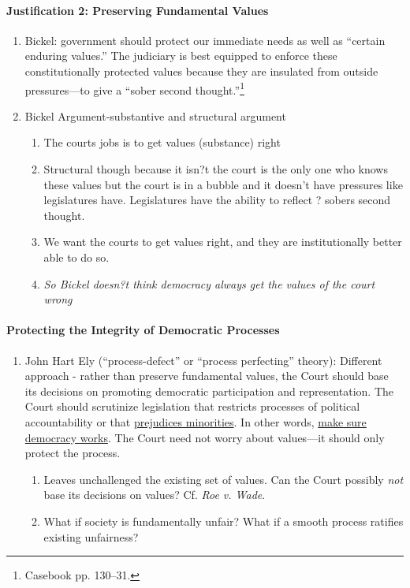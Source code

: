 \begin{enumerate}
\paragraph{Justification 2: Preserving Fundamental Values}

\begin{enumerate}
    \item Bickel: government should protect our immediate needs as well as 
    ``certain enduring values.'' The judiciary is best equipped to enforce 
    these constitutionally protected values because they are insulated from 
    outside pressures---to give a ``sober second thought.''\footnote{Casebook 
    pp. 130--31.}
  \item Bickel Argument-substantive and structural argument
  \begin{enumerate}
  \item The courts jobs is to get values (substance) right
\item Structural though because it isn?t the court is the only one who knows these values but the court is in a bubble and it doesn't have pressures like legislatures have. Legislatures have the ability to reflect ? sobers second thought. 
\item We want the courts to get values right, and they are institutionally better able to do so. 
\item \emph{So Bickel doesn?t think democracy always get the values of the court wrong}
\end{enumerate}
\end{enumerate}
\paragraph{Protecting the Integrity of Democratic Processes}

\begin{enumerate}
    \item John Hart Ely (``process-defect'' or ``process perfecting'' theory): 
    Different approach - rather than preserve fundamental values, the Court should base its 
    decisions on promoting democratic participation and representation. The 
    Court should scrutinize legislation that restricts processes of political 
    accountability or that \underline{prejudices minorities}. In other words, \underline{make sure 
    democracy works}. The Court need not worry about values---it should only 
    protect the process.
    \begin{enumerate}
        \item Leaves unchallenged the existing set of values. Can the Court 
        possibly \emph{not} base its decisions on values? Cf. \emph{Roe v. 
        Wade}.
        \item What if society is fundamentally unfair? What if a smooth 
        process ratifies existing unfairness?
    \end{enumerate}
\end{enumerate}


\end{enumerate}

